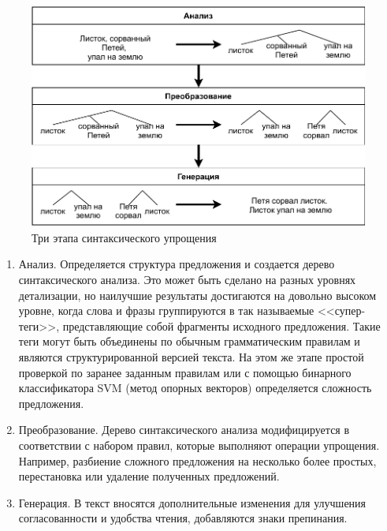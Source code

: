 \captionsetup{justification=centering,singlelinecheck=off}
\begin{figure}[h!]
	\centering
		\includegraphics[pages=-, scale=0.9]{./inc/img/3steps_my_new.pdf}
		\caption{Три этапа синтаксического упрощения}  
		\label{fig:3steps}
\end{figure}
\begin{enumerate}
	\item Анализ. Определяется структура предложения и создается дерево синтаксического анализа. Это может быть сделано на разных уровнях детализации, но наилучшие результаты достигаются на довольно высоком уровне, когда слова и фразы группируются в так называемые <<супер-теги>>, представляющие собой фрагменты исходного предложения. Такие теги могут быть объединены по обычным грамматическим правилам и являются структурированной версией текста. На этом же этапе простой проверкой по заранее заданным правилам или с помощью бинарного классификатора SVM (метод опорных векторов)\cite{shardlow_survey_2014} определяется сложность предложения.
	
	\item Преобразование. Дерево синтаксического анализа модифицируется в соответствии с набором правил, которые выполняют операции упрощения. Например, разбиение сложного предложения на несколько более простых, перестановка или удаление полученных предложений\cite{hutchison_ernesta_2013}.
	
	\item Генерация. В текст вносятся дополнительные изменения для улучшения согласованности и удобства чтения, добавляются знаки препинания.
\end{enumerate}

